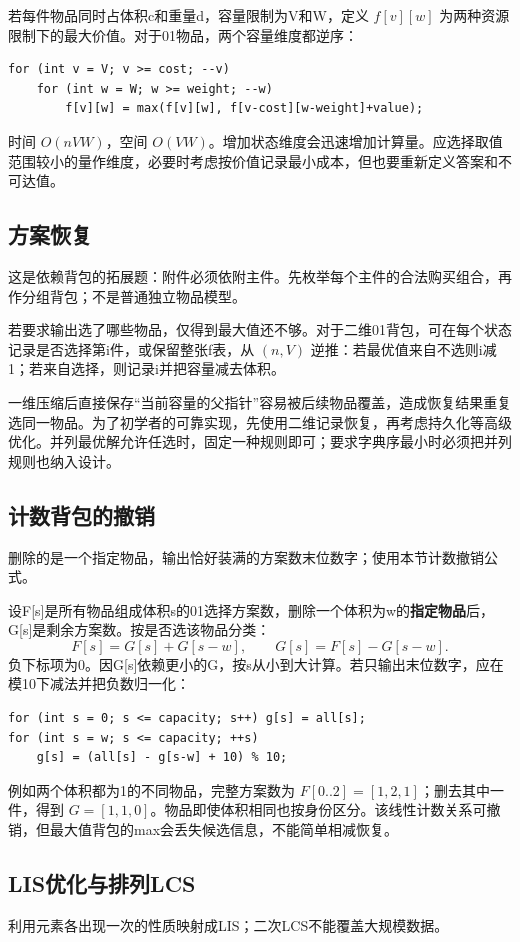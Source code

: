 若每件物品同时占体积c和重量d，容量限制为V和W，定义 $f[v][w]$ 为两种资源限制下的最大价值。对于01物品，两个容量维度都逆序：
\begin{lstlisting}
for (int v = V; v >= cost; --v)
    for (int w = W; w >= weight; --w)
        f[v][w] = max(f[v][w], f[v-cost][w-weight]+value);
\end{lstlisting}
时间 $O(nVW)$，空间 $O(VW)$。增加状态维度会迅速增加计算量。应选择取值范围较小的量作维度，必要时考虑按价值记录最小成本，但也要重新定义答案和不可达值。

\subsection{方案恢复}
这是依赖背包的拓展题：附件必须依附主件。先枚举每个主件的合法购买组合，再作分组背包；不是普通独立物品模型。

若要求输出选了哪些物品，仅得到最大值还不够。对于二维01背包，可在每个状态记录是否选择第i件，或保留整张f表，从 $(n,V)$ 逆推：若最优值来自不选则i减1；若来自选择，则记录i并把容量减去体积。

一维压缩后直接保存“当前容量的父指针”容易被后续物品覆盖，造成恢复结果重复选同一物品。为了初学者的可靠实现，先使用二维记录恢复，再考虑持久化等高级优化。并列最优解允许任选时，固定一种规则即可；要求字典序最小时必须把并列规则也纳入设计。

\subsection{计数背包的撤销}
删除的是一个指定物品，输出恰好装满的方案数末位数字；使用本节计数撤销公式。

设F[s]是所有物品组成体积s的01选择方案数，删除一个体积为w的\textbf{指定物品}后，G[s]是剩余方案数。按是否选该物品分类：
\[F[s]=G[s]+G[s-w],\qquad G[s]=F[s]-G[s-w].\]
负下标项为0。因G[s]依赖更小的G，按s从小到大计算。若只输出末位数字，应在模10下减法并把负数归一化：
\begin{lstlisting}
for (int s = 0; s <= capacity; s++) g[s] = all[s];
for (int s = w; s <= capacity; ++s)
    g[s] = (all[s] - g[s-w] + 10) % 10;
\end{lstlisting}
例如两个体积都为1的不同物品，完整方案数为 $F[0..2]=[1,2,1]$；删去其中一件，得到 $G=[1,1,0]$。物品即使体积相同也按身份区分。该线性计数关系可撤销，但最大值背包的max会丢失候选信息，不能简单相减恢复。

\subsection{LIS优化与排列LCS}
利用元素各出现一次的性质映射成LIS；二次LCS不能覆盖大规模数据。

